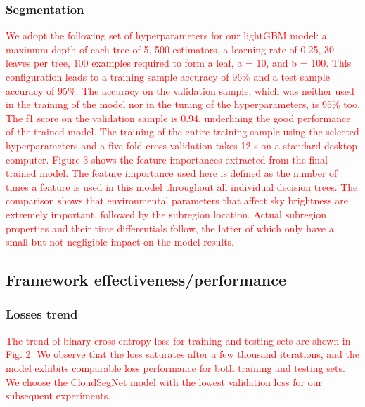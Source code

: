 \documentclass[amt, article]{copernicus}
\begin{document}
\subsubsection{Segmentation}

\textcolor{red}{We adopt the following set of hyperparameters for our lightGBM model: a maximum depth of each tree of 5, 500 estimators, a learning rate of 0.25, 30 leaves per tree, 100 examples required to form a leaf, a = 10, and b = 100. This configuration leads to a training sample accuracy of 96\% and a
test sample accuracy of 95\%. The accuracy on the validation
sample, which was neither used in the training of the model nor
in the tuning of the hyperparameters, is 95\% too. The f1 score
on the validation sample is 0.94, underlining the good
performance of the trained model.
The training of the entire training sample using the selected
hyperparameters and a five-fold cross-validation takes 12 s on
a standard desktop computer. Figure 3 shows the feature importances extracted from the
final trained model. The feature importance used here is defined
as the number of times a feature is used in this model
throughout all individual decision trees. The comparison shows
that environmental parameters that affect sky brightness are
extremely important, followed by the subregion location.
Actual subregion properties and their time differentials follow,
the latter of which only have a small-but not negligible impact on the model results.}

\subsection{Framework effectiveness/performance}

\subsubsection{Losses trend}

\textcolor{red}{The trend of binary cross-entropy loss for training and testing sets are shown in Fig. 2. We observe that the loss saturates after
a few thousand iterations, and the model exhibits comparable
loss performance for both training and testing sets. We choose
the CloudSegNet model with the lowest validation loss for our
subsequent experiments.}
\end{document}
